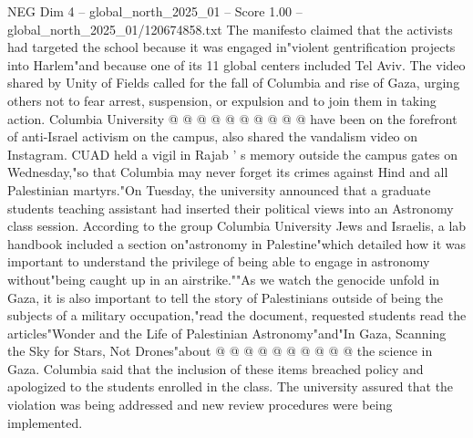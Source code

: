\begin{textsample}{NEG Dim 4 – global\_north\_2025\_01 – Score 1.00 – global\_north\_2025\_01/120674858.txt}
The manifesto claimed that the activists had targeted the school because it was engaged in"violent gentrification projects into Harlem"and because one of its 11 global centers included Tel Aviv.
The video shared by Unity of Fields called for the fall of Columbia and rise of Gaza, urging others not to fear arrest, suspension, or expulsion and to join them in taking action.
Columbia University @ @ @ @ @ @ @ @ @ @ have been on the forefront of anti-Israel activism on the campus, also shared the vandalism video on Instagram.
CUAD held a vigil in Rajab ' s memory outside the campus gates on Wednesday,"so that Columbia may never forget its crimes against Hind and all Palestinian martyrs."On Tuesday, the university announced that a graduate students teaching assistant had inserted their political views into an Astronomy class session.
According to the group Columbia University Jews and Israelis, a lab handbook included a section on"astronomy in Palestine"which detailed how it was important to understand the privilege of being able to engage in astronomy without"being caught up in an airstrike.""As we watch the genocide unfold in Gaza, it is also important to tell the story of Palestinians outside of being the subjects of a military occupation,"read the document, requested students read the articles"Wonder and the Life of Palestinian Astronomy"and"In Gaza, Scanning the Sky for Stars, Not Drones"about @ @ @ @ @ @ @ @ @ @ the science in Gaza.
Columbia said that the inclusion of these items breached policy and apologized to the students enrolled in the class.
The university assured that the violation was being addressed and new review procedures were being implemented.

\end{textsample}
